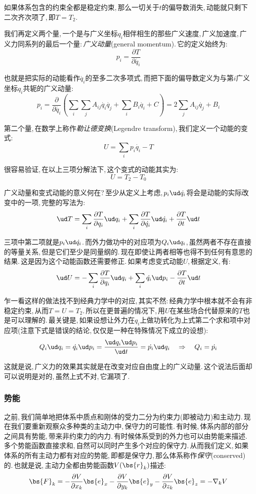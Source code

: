 如果体系包含的约束全都是稳定约束,\,那么一切关于$t$的偏导数消失,\,动能就只剩下二次齐次项了,\,即$T=T_2$.

我们再定义两个量,\,一个是与广义坐标$q_i$相伴相生的那些广义速度,\,广义加速度,\,广义力同系列的最后一个量:\,\emph{广义动量}(general momentum).\,它的定义始终为:
\[p_i=\frac{\partial T}{\partial \dot{q_i}}\]

也就是把实际的动能看作$\dot{q_i}$的至多二次多项式,\,而把下面的偏导数定义为与第$i$广义坐标$q_i$共轭的广义动量:
\[p_i=\frac{\partial}{\partial \dot{q_i}}\left(\sum_i\sum_j A_{ij}\dot{q_i}\dot{q_j}+\sum_i B_i \dot{q_i}+C\right)=2\sum_j A_{ij}\dot{q_j}+B_i\]

第二个量,\,在数学上称作\emph{勒让德变换}(Legendre transform),\,我们定义一个动能的变式:
\[U=\sum_i p_i\dot{q_i}-T\]

很容易验证,\,在以上三项分解法下,\,这个变式的动能其实为:
\[U=T_2-T_0\]

广义动量和变式动能的意义何在?\,至少从定义上考虑,\,$p_i\ud \dot{q_i}$将会是动能的实际改变中的一项,\,完整的写法为:
\[\ud T=\sum_i \frac{\partial T}{\partial q_i}\ud q_i+\sum_i \frac{\partial T}{\partial \dot{q_i}}\ud \dot{q_i}+\frac{\partial T}{\partial t}\ud t\]

三项中第二项就是$p_i\ud \dot{q_i}$.\,而外力做功中的对应项为$Q_i\ud q_i$,\,虽然两者不存在直接的等量关系,\,但是它们至少是同量纲的.\,现在即使让两者相等也得不到任何有意思的结果.\,这是因为这个动能函数还需要修正.\,如果考虑变式动能$U$,\,根据定义,\,有:
\[\ud U=-\sum_i \frac{\partial T}{\partial q_i}\ud q_i+\sum_i \dot{q_i}\ud p_i-\frac{\partial T}{\partial t}\ud t\]

乍一看这样的做法找不到经典力学中的对应,\,其实不然:\,经典力学中根本就不会有非稳定约束,\,从而$T=U=T_2$.\,所以在更普遍的情况下,\,用$U$在某些场合代替原来的$T$也是可以理解的.\,最关键是,\,如果设想让外力在$q_i$上做功转化为上式第二个求和项中对应项(注意下式是错误的结论,\,仅仅是一种在特殊情况下成立的设想):
\[Q_i\ud q_i=\dot{q_i}\ud p_i=\frac{\ud q_i \ud p_i}{\ud t}=\dot{p_i}\ud q_i\quad\Rightarrow\quad Q_i=\dot{p_i}\]

这就是说,\,广义力的效果其实就是在改变对应自由度上的广义动量.\,这个说法后面却可以说明是对的,\,虽然上式不对,\,它漏项了.

\subsubsection{势能}

之前,\,我们简单地把体系中质点和刚体的受力二分为约束力(即被动力)和主动力.\,现在我们要重新观察众多种类的主动力中,\,保守力的可能性.\,有时候,\,体系内部的部分之间具有势能,\,带来非约束力的内力.\,有时候体系受到的外力也可以由势能来描述.\,多个势能函数直接求和,\,自然可以同时产生多个对应的保守力.\,从而我们定义,\,如果体系的所有主动力都有对应的势能,\,即都是保守力,\,那么体系称作\emph{保守}(conserved)的.\,也就是说,\,主动力全都由势能函数$V(\bs{r}_k)$描述:
\[\bs{F}_k=-\frac{\partial V}{\partial x_k}\bs{e}_x-\frac{\partial V}{\partial y_k}\bs{e}_y-\frac{\partial V}{\partial z_k}\bs{e}_z=-\nabla_k V\]


